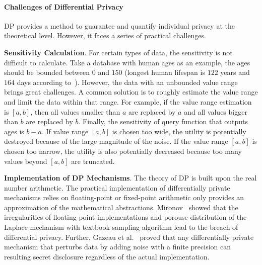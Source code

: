 \paragraph{Challenges of Differential Privacy}
\label{subsubsec:challengesOfDP}
DP provides a method to guarantee and quantify individual privacy at the theoretical level. However, it faces a series of practical challenges.

\textbf{Sensitivity Calculation}. For certain types of data, the sensitivity is not difficult to calculate. Take a database with human ages as an example, the ages should be bounded between $0$ and $150$ (longest human lifespan is $122$ years and $164$ days according to~\cite{whitney_1997}). However, the data with an unbounded value range brings great challenges. A common solution is to roughly estimate the value range and limit the data within that range. For example, if the value range estimation is $\left[ a,b\right] $, then all values smaller than $a$ are replaced by $a$ and all values bigger than $b$ are replaced by $b$. Finally, the sensitivity of query function that outputs ages is ${b- a}$. If value range $\left[ a,b\right] $ is chosen too wide, the utility is potentially destroyed because of the large magnitude of the noise. If the value range $\left[ a,b\right] $ is chosen too narrow, the utility is also potentially decreased because too many values beyond $\left[ a,b\right] $ are truncated.

\textbf{Implementation of DP Mechanisms}. The theory of DP is built upon the real number arithmetic. The practical implementation of differentially private mechanisms relies on floating-point or fixed-point arithmetic only provides an approximation of the mathematical abstractions. Mironov~\cite{mironov2012significance} showed that the irregularities of floating-point implementations and porouse distribution of the Laplace mechanism with textbook sampling algorithm lead to the breach of differential privacy. Further, Gazeau et al.~\cite{gazeau2016preserving} proved that any differentially private mechanism that perturbs data by adding noise with a finite precision can resulting secret disclosure regardless of the actual implementation.



